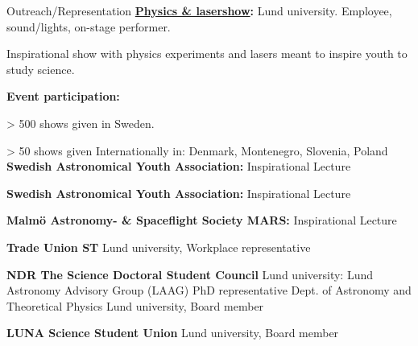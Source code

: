 \begin{rubric}{Outreach/Representation}
\entry*[2013 - ]%
\textbf{\href{https://www.facebook.com/Physicsandlasershow}{Physics \& lasershow}:} Lund university. Employee, sound/lights, on-stage performer. \par Inspirational show with physics experiments and lasers meant to inspire youth to study science. \par
\textbf{Event participation:} \par
> 500 shows given in Sweden. \par
> 50 shows given Internationally in: Denmark, Montenegro, Slovenia, Poland
\entry*[2021]
%
\textbf{Swedish Astronomical Youth Association:} Inspirational Lecture \par
\entry*[2020]
%
\textbf{Swedish Astronomical Youth Association:} Inspirational Lecture \par
\entry*[2020]
%
\textbf{Malmö Astronomy- \& Spaceflight Society MARS:} Inspirational Lecture \par

\entry*[2021 -]%
\textbf{Trade Union ST} Lund university, Workplace representative\par

%
\entry*[]
\textbf{NDR The Science Doctoral Student Council} Lund university:
\entry*[\prefix{}2020 -] Lund Astronomy Advisory Group (LAAG) PhD representative
\entry*[2017-2018] Dept. of Astronomy and Theoretical Physics Lund university, Board member\par
{}%
\textbf{LUNA Science Student Union} Lund university, Board member \par

\end{rubric}